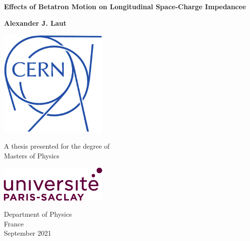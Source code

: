 \begin{titlepage}
    \centering
    \vspace*{1cm}
        
    \Huge
    \textbf{Effects of Betatron Motion on Longitudinal Space-Charge Impedancee}
        
    \vspace{0.5cm}
    \LARGE
        
    \vspace{1.5cm}
        
    \textbf{Alexander J. Laut}
        
    \vfill
        
    \includegraphics[width=0.4\textwidth]{logos/LogoOutline-Bleu.pdf}
    \vfill
    
    A thesis presented for the degree of\\
    Masters of Physics
    
    \vspace{0.8cm}
        
    \includegraphics[width=0.4\textwidth]{logos/logo.png}
    
    \Large
    Department of Physics\\
    France\\
    September 2021
    
\end{titlepage}

